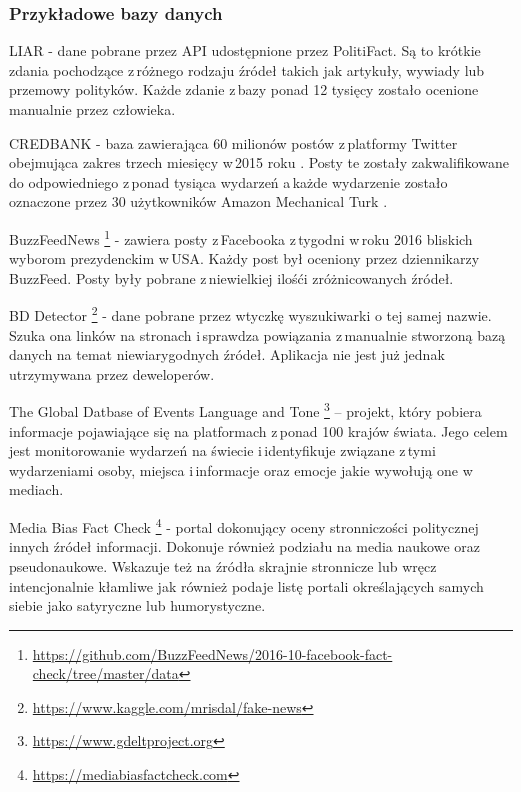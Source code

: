 \subsubsection{Przykładowe bazy danych}
    \par LIAR
    - dane pobrane przez API udostępnione przez PolitiFact. Są to krótkie zdania pochodzące z\,różnego rodzaju źródeł takich jak artykuły, wywiady lub przemowy polityków. Każde zdanie z\,bazy ponad 12 tysięcy zostało ocenione manualnie przez człowieka\cite{wang2017liar}.
    \par CREDBANK  - baza zawierająca 60 milionów postów z\,platformy Twitter obejmująca zakres trzech miesięcy w\,2015 roku \cite{mitra2015credbank}. Posty te zostały zakwalifikowane do odpowiedniego z\,ponad tysiąca wydarzeń a\,każde wydarzenie zostało oznaczone przez 30 użytkowników Amazon Mechanical Turk .
    \par BuzzFeedNews
    \footnote{\url{https://github.com/BuzzFeedNews/2016-10-facebook-fact-check/tree/master/data}} 
    - zawiera posty z\,Facebooka z\,tygodni w\,roku 2016 bliskich wyborom prezydenckim w\,USA. Każdy post był oceniony przez dziennikarzy BuzzFeed. Posty były pobrane z\,niewielkiej ilośći zróżnicowanych źródeł.
    \par BD Detector
    \footnote{\url{https://www.kaggle.com/mrisdal/fake-news}}
    - dane pobrane przez wtyczkę wyszukiwarki o tej samej nazwie. Szuka ona linków na stronach i\,sprawdza powiązania z\,manualnie stworzoną bazą danych na temat niewiarygodnych źródeł.  Aplikacja nie jest już jednak utrzymywana przez deweloperów.
    \par The Global Datbase of Events Language and Tone
    \footnote{\url{https://www.gdeltproject.org}}
    – projekt, który pobiera informacje pojawiające się na platformach z\,ponad 100 krajów świata. Jego celem jest monitorowanie wydarzeń na świecie i\,identyfikuje związane z\,tymi wydarzeniami osoby, miejsca i\,informacje oraz emocje jakie wywołują one w\,mediach. 
    \par Media Bias Fact Check
    \footnote{\url{https://mediabiasfactcheck.com}}
    - portal dokonujący oceny stronniczości politycznej innych źródeł informacji. Dokonuje również podziału na media naukowe oraz pseudonaukowe. Wskazuje też na źródła skrajnie stronnicze lub wręcz intencjonalnie kłamliwe jak również podaje listę portali określających samych siebie jako satyryczne lub humorystyczne. 


